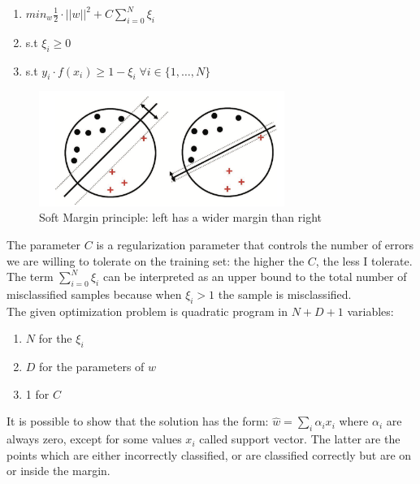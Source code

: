 \documentclass[LaM,binding=0.6cm]{sapthesis}
\begin{document}
\begin{enumerate}
\item $min_{w} \frac{1}{2}\cdot||w||^2 +C\sum_{i=0}^{N}\xi_i$ 
\item s.t $\xi_i\geq0$
\item s.t $y_i\cdot f(x_i)\geq1-\xi_i \; \forall i \in \{1,\dots,N\}$
\end{enumerate}
\begin{figure}[H]  \centering
    \includegraphics[width=80mm,scale=0.7]{largevssoft}
    \caption{Soft Margin principle: left has a wider margin than right \cite{bishop}}
    \label{fig:largevssoft}
\end{figure}
The parameter $C$ is a regularization parameter that controls the number of errors we are willing to tolerate on the training set: the higher the $C$, the less I tolerate.\\The term $\sum_{i=0}^{N}\xi_i$ can be interpreted as an upper bound to the total number of misclassified samples because when $\xi_i>1$ the sample is misclassified.\\The given optimization problem is quadratic program in $N + D + 1$ variables: 
\begin{enumerate}
\item $N$ for the $\xi_i$
\item $D$ for the parameters of $w$
\item 1 for $C$
\end{enumerate}
It is possible to show that the solution has the form: $\hat{w}=\sum_i\alpha_ix_i$ where $\alpha_i$ are always zero, except for some values $x_i$ called support vector. The latter are the points which are either incorrectly classified, or are classified correctly but are on or inside the margin.
\end{document}
